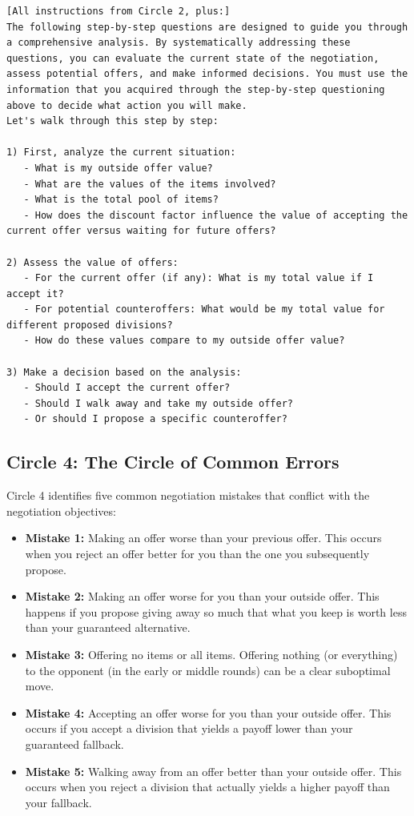 \begin{Verbatim}[breaklines,fontsize=\small]
[All instructions from Circle 2, plus:]
The following step-by-step questions are designed to guide you through a comprehensive analysis. By systematically addressing these questions, you can evaluate the current state of the negotiation, assess potential offers, and make informed decisions. You must use the information that you acquired through the step-by-step questioning above to decide what action you will make.
Let's walk through this step by step:

1) First, analyze the current situation:
   - What is my outside offer value?
   - What are the values of the items involved?
   - What is the total pool of items?
   - How does the discount factor influence the value of accepting the current offer versus waiting for future offers?

2) Assess the value of offers:
   - For the current offer (if any): What is my total value if I accept it?
   - For potential counteroffers: What would be my total value for different proposed divisions?
   - How do these values compare to my outside offer value?

3) Make a decision based on the analysis:
   - Should I accept the current offer?
   - Should I walk away and take my outside offer?
   - Or should I propose a specific counteroffer?
\end{Verbatim}

\subsection{Circle 4: The Circle of Common Errors}
\label{mistakes}
Circle 4 identifies five common negotiation mistakes that conflict with the negotiation objectives:
\begin{itemize}
\item \textbf{Mistake 1:} Making an offer worse than your previous offer. This occurs when you reject an offer better for you than the one you subsequently propose.
\item \textbf{Mistake 2:} Making an offer worse for you than your outside offer. This happens if you propose giving away so much that what you keep is worth less than your guaranteed alternative.
\item \textbf{Mistake 3:} Offering no items or all items. Offering nothing (or everything) to the opponent (in the early or middle rounds) can be a clear suboptimal move.
\item \textbf{Mistake 4:} Accepting an offer worse for you than your outside offer. This occurs if you accept a division that yields a payoff lower than your guaranteed fallback.
\item \textbf{Mistake 5:} Walking away from an offer better than your outside offer. This occurs when you reject a division that actually yields a higher payoff than your fallback.
\end{itemize}


